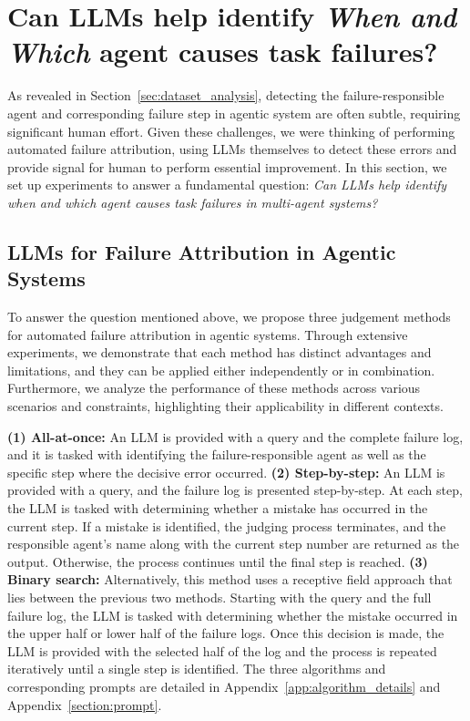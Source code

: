 \section{Can LLMs help identify \emph{When and Which} agent causes task failures?}

As revealed in Section~\ref{sec:dataset_analysis}, detecting the failure-responsible agent and corresponding failure step in agentic system are often subtle, requiring significant human effort. 
Given these challenges, we were thinking of performing automated failure attribution, using LLMs themselves to detect these errors and provide signal for human to perform essential improvement. 
In this section, we set up experiments to answer a fundamental question: 
\textit{Can LLMs help identify \emph{when and which} agent causes task failures in multi-agent systems?} 

\subsection{LLMs for Failure Attribution in Agentic Systems}

To answer the question mentioned above, we propose three judgement methods for automated failure attribution in agentic systems.
Through extensive experiments, we demonstrate that each method has distinct advantages and limitations, and they can be applied either independently or in combination. 
Furthermore, we analyze the performance of these methods across various scenarios and constraints, highlighting their applicability in different contexts.

\textbf{(1) All-at-once:} 
An LLM is provided with a query and the complete failure log, and it is tasked with identifying the failure-responsible agent as well as the specific step where the decisive error occurred. 
\textbf{(2) Step-by-step:}
An LLM is provided with a query, and the failure log is presented step-by-step. At each step, the LLM is tasked with determining whether a mistake has occurred in the current step. If a mistake is identified, the judging process terminates, and the responsible agent's name along with the current step number are returned as the output. Otherwise, the process continues until the final step is reached. 
\textbf{(3) Binary search:}
Alternatively, this method uses a receptive field approach that lies between the previous two methods. Starting with the query and the full failure log, the LLM is tasked with determining whether the mistake occurred in the upper half or lower half of the failure logs. Once this decision is made, the LLM is provided with the selected half of the log and the process is repeated iteratively until a single step is identified. 
The three algorithms and corresponding prompts are detailed in Appendix~\ref{app:algorithm_details} and Appendix~\ref{section:prompt}.


